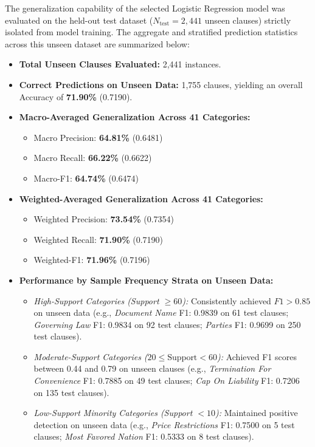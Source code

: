 The generalization capability of the selected Logistic Regression model was evaluated on the held-out test dataset ($N_{\text{test}} = 2,441$ unseen clauses) strictly isolated from model training. The aggregate and stratified prediction statistics across this unseen dataset are summarized below:
\begin{itemize}
    \item \textbf{Total Unseen Clauses Evaluated:} 2,441 instances.
    \item \textbf{Correct Predictions on Unseen Data:} 1,755 clauses, yielding an overall Accuracy of \textbf{71.90\%} (0.7190).
    \item \textbf{Macro-Averaged Generalization Across 41 Categories:}
    \begin{itemize}
        \item Macro Precision: \textbf{64.81\%} (0.6481)
        \item Macro Recall: \textbf{66.22\%} (0.6622)
        \item Macro-F1: \textbf{64.74\%} (0.6474)
    \end{itemize}
    \item \textbf{Weighted-Averaged Generalization Across 41 Categories:}
    \begin{itemize}
        \item Weighted Precision: \textbf{73.54\%} (0.7354)
        \item Weighted Recall: \textbf{71.90\%} (0.7190)
        \item Weighted-F1: \textbf{71.96\%} (0.7196)
    \end{itemize}
    \item \textbf{Performance by Sample Frequency Strata on Unseen Data:}
    \begin{itemize}
        \item \textit{High-Support Categories (Support $\ge 60$):} Consistently achieved $F1 > 0.85$ on unseen data (e.g., \textit{Document Name} F1: 0.9839 on 61 test clauses; \textit{Governing Law} F1: 0.9834 on 92 test clauses; \textit{Parties} F1: 0.9699 on 250 test clauses).
        \item \textit{Moderate-Support Categories ($20 \le \text{Support} < 60$):} Achieved F1 scores between 0.44 and 0.79 on unseen clauses (e.g., \textit{Termination For Convenience} F1: 0.7885 on 49 test clauses; \textit{Cap On Liability} F1: 0.7206 on 135 test clauses).
        \item \textit{Low-Support Minority Categories (Support $< 10$):} Maintained positive detection on unseen data (e.g., \textit{Price Restrictions} F1: 0.7500 on 5 test clauses; \textit{Most Favored Nation} F1: 0.5333 on 8 test clauses).
    \end{itemize}
\end{itemize}

